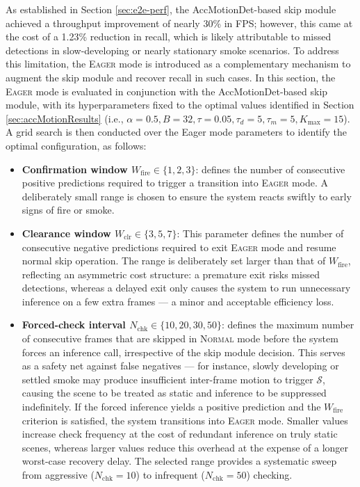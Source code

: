 \documentclass[
  10pt,
]{article}
\begin{document}
As established in Section \ref{sec:e2e-perf}, the AccMotionDet-based
skip module achieved a throughput improvement of nearly 30\% in FPS;
however, this came at the cost of a 1.23\% reduction in recall, which is
likely attributable to missed detections in slow-developing or nearly
stationary smoke scenarios. To address this limitation, the
\textsc{Eager} mode is introduced as a complementary mechanism to
augment the skip module and recover recall in such cases. In this
section, the \textsc{Eager} mode is evaluated in conjunction with the
AccMotionDet-based skip module, with its hyperparameters fixed to the
optimal values identified in Section \ref{sec:accMotionResults} (i.e.,
\(\alpha{=}0.5,B{=}32,\tau{=}0.05,\tau_d{=}5,\tau_m{=}5,K_{\max}{=}15\)).
A grid search is then conducted over the Eager mode parameters to
identify the optimal configuration, as follows:

\begin{itemize}
\item
  \textbf{Confirmation window \(W_{\mathrm{fire}} \in \{1, 2, 3\}\)}:
  defines the number of consecutive positive predictions required to
  trigger a transition into \textsc{Eager} mode. A deliberately small
  range is chosen to ensure the system reacts swiftly to early signs of
  fire or smoke.
\item
  \textbf{Clearance window \(W_{\mathrm{clr}} \in \{3, 5, 7\}\)}: This
  parameter defines the number of consecutive negative predictions
  required to exit \textsc{Eager} mode and resume normal skip operation.
  The range is deliberately set larger than that of
  \(W_{\mathrm{fire}}\), reflecting an asymmetric cost structure: a
  premature exit risks missed detections, whereas a delayed exit only
  causes the system to run unnecessary inference on a few extra frames
  --- a minor and acceptable efficiency loss.
\item
  \textbf{Forced-check interval
  \(N_{\mathrm{chk}} \in \{10, 20, 30, 50\}\)}: defines the maximum
  number of consecutive frames that are skipped in \textsc{Normal} mode
  before the system forces an inference call, irrespective of the skip
  module decision. This serves as a safety net against false negatives
  --- for instance, slowly developing or settled smoke may produce
  insufficient inter-frame motion to trigger \(\mathcal{S}\), causing
  the scene to be treated as static and inference to be suppressed
  indefinitely. If the forced inference yields a positive prediction and
  the \(W_{\mathrm{fire}}\) criterion is satisfied, the system
  transitions into \textsc{Eager} mode. Smaller values increase check
  frequency at the cost of redundant inference on truly static scenes,
  whereas larger values reduce this overhead at the expense of a longer
  worst-case recovery delay. The selected range provides a systematic
  sweep from aggressive (\(N_{\mathrm{chk}} = 10\)) to infrequent
  (\(N_{\mathrm{chk}} = 50\)) checking.
\end{itemize}
\end{document}
